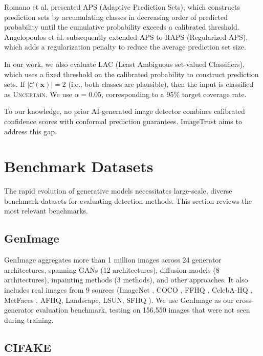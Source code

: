 Romano et al. \cite{romano2020classification} presented APS (Adaptive Prediction Sets), which constructs prediction sets by accumulating classes in decreasing order of predicted probability until the cumulative probability exceeds a calibrated threshold. Angelopoulos et al. \cite{angelopoulos2021uncertainty} subsequently extended APS to RAPS (Regularized APS), which adds a regularization penalty to reduce the average prediction set size.

In our work, we also evaluate LAC (Least Ambiguous set-valued Classifiers), which uses a fixed threshold on the calibrated probability to construct prediction sets. If $|\mathcal{C}(\mathbf{x})| = 2$ (i.e., both classes are plausible), then the input is classified as \textsc{Uncertain}. We use $\alpha{=}0.05$, corresponding to a 95\% target coverage rate.

To our knowledge, no prior AI-generated image detector combines calibrated confidence scores with conformal prediction guarantees. ImageTrust aims to address this gap.


\section{Benchmark Datasets}\label{sec:datasets-related}

The rapid evolution of generative models necessitates large-scale, diverse benchmark datasets for evaluating detection methods. This section reviews the most relevant benchmarks.

\subsection{GenImage}\label{sec:genimage}

GenImage \cite{zhu2024genimage} aggregates more than 1 million images across 24 generator architectures, spanning GANs (12 architectures), diffusion models (8 architectures), inpainting methods (3 methods), and other approaches. It also includes real images from 9 sources (ImageNet \cite{deng2009imagenet}, COCO \cite{lin2014coco}, FFHQ \cite{karras2019ffhq}, CelebA-HQ \cite{karras2018celeba}, MetFaces \cite{karras2020metfaces}, AFHQ, Landscape, LSUN, SFHQ \cite{david2022sfhq}). We use GenImage as our cross-generator evaluation benchmark, testing on 156,550 images that were not seen during training.

\subsection{CIFAKE}\label{sec:cifake}


